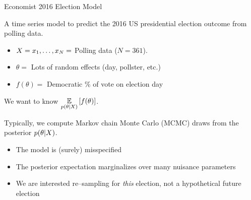 
\begin{frame}{Economist 2016 Election Model \citep{economist:2020:election}}

\begin{minipage}[t]{0.35\textwidth}
    \ElectionData{}
\end{minipage}
\begin{minipage}{0.04\textwidth}
\hfill
\end{minipage}
\begin{minipage}[t]{0.59\textwidth}

A time series model to predict the 2016 US presidential election
outcome from polling data.

\spskip
\begin{itemize}
\item $X = x_1, \ldots, x_N =$ Polling data ($N = 361$).
\item $\theta = $ Lots of random effects (day, pollster, etc.)
\item $f(\theta) = $ Democratic \% of vote on election day
\end{itemize}

\spskip
We want to know $\underset{p(\theta \vert X)}{\mathbb{E}}\left[f(\theta)\right]$.

\spskip
Typically, we compute Markov chain Monte Carlo (MCMC) draws from the
posterior $p(\theta \vert X)$.


\end{minipage}


\pause



\pause
%
\begin{itemize}
\item The model is (surely) misspecified
\item The posterior expectation marginalizes over many nuisance parameters
\item We are interested re--sampling for \textit{this} election, not a hypothetical future election
\end{itemize}
%


\end{frame}







